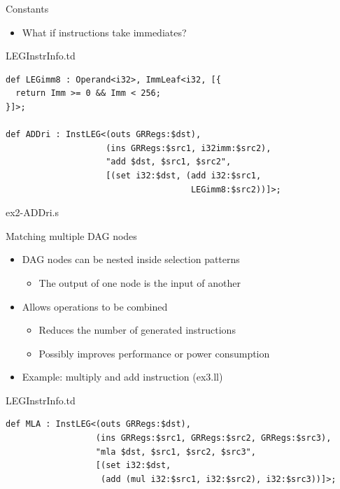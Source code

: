 
\begin{frame}[fragile]{Constants}

\begin{itemize}
    \item What if instructions take immediates?
\end{itemize}

\begin{block}{LEGInstrInfo.td}
\begin{lstlisting}
def LEGimm8 : Operand<i32>, ImmLeaf<i32, [{
  return Imm >= 0 && Imm < 256;
}]>;

def ADDri : InstLEG<(outs GRRegs:$dst),
                    (ins GRRegs:$src1, i32imm:$src2),
                    "add $dst, $src1, $src2",
                    [(set i32:$dst, (add i32:$src1, 
                                     LEGimm8:$src2))]>;
\end{lstlisting}
\end{block}

\begin{block}{ex2-ADDri.s}

\end{block}

\end{frame}


\begin{frame}[fragile]{Matching multiple DAG nodes}

\begin{itemize}
    \item DAG nodes can be nested inside selection patterns
    \begin{itemize}
        \item The output of one node is the input of another
    \end{itemize}
    \item Allows operations to be combined
    \begin{itemize}
        \item Reduces the number of generated instructions
        \item Possibly improves performance or power consumption
    \end{itemize}
    \item Example: multiply and add instruction (ex3.ll)
\end{itemize}

\begin{block}{LEGInstrInfo.td}
\begin{lstlisting}
def MLA : InstLEG<(outs GRRegs:$dst),
                  (ins GRRegs:$src1, GRRegs:$src2, GRRegs:$src3),
                  "mla $dst, $src1, $src2, $src3",
                  [(set i32:$dst,
                   (add (mul i32:$src1, i32:$src2), i32:$src3))]>;
\end{lstlisting}
\end{block}

\end{frame}

